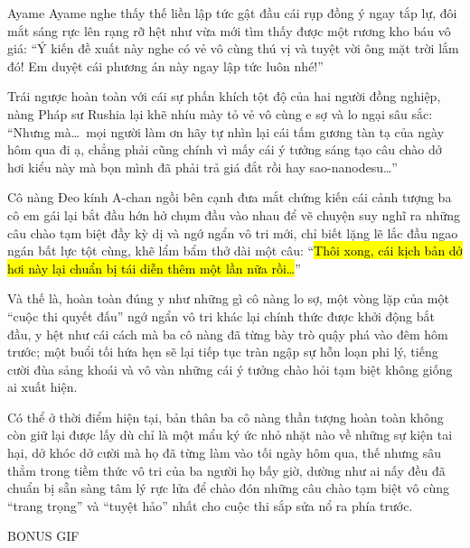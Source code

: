 \documentclass[../main.tex]{subfiles}
\begin{document}
Ayame Ayame nghe thấy thế liền lập tức gật đầu cái rụp đồng ý ngay tắp lự, đôi mắt sáng rực lên rạng rỡ hệt như vừa mới tìm thấy được một rương kho báu vô giá: ``Ý kiến đề xuất này nghe có vẻ vô cùng thú vị và tuyệt vời ông mặt trời lắm đó! Em duyệt cái phương án này ngay lập tức luôn nhé!''

Trái ngược hoàn toàn với cái sự phấn khích tột độ của hai người đồng nghiệp, nàng Pháp sư Rushia lại khẽ nhíu mày tỏ vẻ vô cùng e sợ và lo ngại sâu sắc: ``Nhưng mà\dots\ mọi người làm ơn hãy tự nhìn lại cái tấm gương tàn tạ của ngày hôm qua đi ạ, chẳng phải cũng chính vì mấy cái ý tưởng sáng tạo câu chào dở hơi kiểu này mà bọn mình đã phải trả giá đắt rồi hay sao-nanodesu\dots''

Cô nàng Đeo kính A-chan ngồi bên cạnh đưa mắt chứng kiến cái cảnh tượng ba cô em gái lại bắt đầu hớn hở chụm đầu vào nhau để vẽ chuyện suy nghĩ ra những câu chào tạm biệt đầy kỳ dị và ngớ ngẩn vô tri mới, chỉ biết lặng lẽ lắc đầu ngao ngán bất lực tột cùng, khẽ lẩm bẩm thở dài một câu: ``\hl{Thôi xong, cái kịch bản dở hơi này lại chuẩn bị tái diễn thêm một lần nữa rồi\dots}''

Và thế là, hoàn toàn đúng y như những gì cô nàng lo sợ, một vòng lặp của một ``cuộc thi quyết đấu'' ngớ ngẩn vô tri khác lại chính thức được khởi động bắt đầu, y hệt như cái cách mà ba cô nàng đã từng bày trò quậy phá vào đêm hôm trước; một buổi tối hứa hẹn sẽ lại tiếp tục tràn ngập sự hỗn loạn phi lý, tiếng cười đùa sảng khoái và vô vàn những cái ý tưởng chào hỏi tạm biệt không giống ai xuất hiện.

Có thể ở thời điểm hiện tại, bản thân ba cô nàng thần tượng hoàn toàn không còn giữ lại được lấy dù chỉ là một mẩu ký ức nhỏ nhặt nào về những sự kiện tai hại, dở khóc dở cười mà họ đã từng làm vào tối ngày hôm qua, thế nhưng sâu thẳm trong tiềm thức vô tri của ba người họ bấy giờ, dường như ai nấy đều đã chuẩn bị sẵn sàng tâm lý rực lửa để chào đón những câu chào tạm biệt vô cùng ``trang trọng'' và ``tuyệt hảo'' nhất cho cuộc thi sắp sửa nổ ra phía trước.

\begin{center}{\abv\Large BONUS GIF}\end{center}

\end{document}
